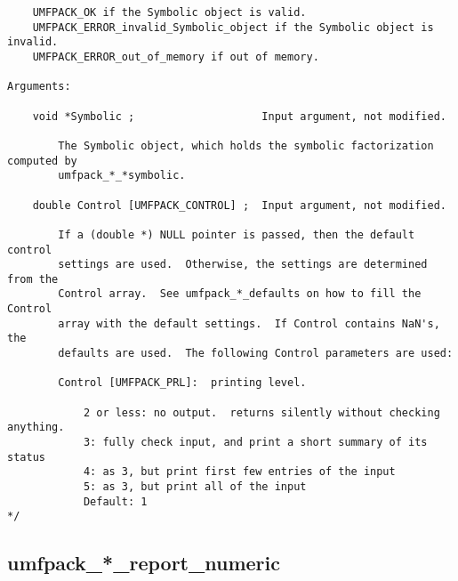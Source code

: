 \documentclass[11pt]{article}
\begin{document}
{\begin{verbatim}
    UMFPACK_OK if the Symbolic object is valid.
    UMFPACK_ERROR_invalid_Symbolic_object if the Symbolic object is invalid.
    UMFPACK_ERROR_out_of_memory if out of memory.

Arguments:

    void *Symbolic ;                    Input argument, not modified.

        The Symbolic object, which holds the symbolic factorization computed by
        umfpack_*_*symbolic.

    double Control [UMFPACK_CONTROL] ;  Input argument, not modified.

        If a (double *) NULL pointer is passed, then the default control
        settings are used.  Otherwise, the settings are determined from the
        Control array.  See umfpack_*_defaults on how to fill the Control
        array with the default settings.  If Control contains NaN's, the
        defaults are used.  The following Control parameters are used:

        Control [UMFPACK_PRL]:  printing level.

            2 or less: no output.  returns silently without checking anything.
            3: fully check input, and print a short summary of its status
            4: as 3, but print first few entries of the input
            5: as 3, but print all of the input
            Default: 1
*/
\end{verbatim}
}

\newpage
\subsection{umfpack\_*\_report\_numeric}
\end{document}
